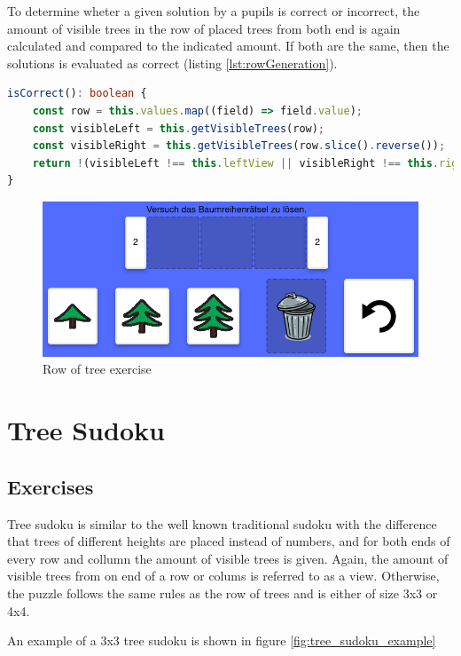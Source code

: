 To determine wheter a given solution by a pupils is correct or incorrect, the amount of visible trees in the row of placed trees from both end is again calculated and compared to the indicated amount. If both are the same, then the solutions is evaluated as correct (listing \ref{lst:rowGeneration}).

\begin{lstlisting}[language=TypeScript,caption={Correctness check of a row of tree exercise solution},label={lst:rowCorrectness}]
isCorrect(): boolean {
    const row = this.values.map((field) => field.value);
    const visibleLeft = this.getVisibleTrees(row);
    const visibleRight = this.getVisibleTrees(row.slice().reverse());
    return !(visibleLeft !== this.leftView || visibleRight !== this.rightView);
}
\end{lstlisting}

\begin{figure} 
    \centering
    \includegraphics[width=0.8 \columnwidth]{figures/tree_row_example_exercise.png}
    \caption{Row of tree exercise} 
    \label{fig:tree_row_example_exercise} 
\end{figure}

\section{Tree Sudoku}
\label{section:treeSudoku}

\subsection{Exercises}
Tree sudoku is similar to the well known traditional sudoku with the difference that trees of different heights are placed instead of numbers, and for both ends of every row and collumn the amount of visible trees is given. Again, the amount of visible trees from on end of a row or colums is referred to as a view. Otherwise, the puzzle follows the same rules as the row of trees and is either of size 3x3 or 4x4.

\begin{example}
    An example of a 3x3 tree sudoku is shown in figure \ref{fig:tree_sudoku_example}
\end{example}


